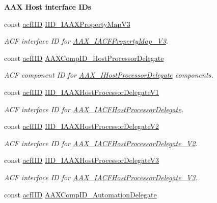 \begin{Indent}{\bf A\+A\+X Host interface I\+Ds}
\begin{DoxyCompactItemize}
const \hyperlink{a00150_a59df0b41744eee7a066787aaedf97f67}{acf\+I\+I\+D} \hyperlink{a00299_a26d424454425e6feb3a0c120466fe971}{I\+I\+D\+\_\+\+I\+A\+A\+X\+Property\+Map\+V3}
\begin{DoxyCompactList}\small\item\em A\+C\+F interface I\+D for \hyperlink{a00081}{A\+A\+X\+\_\+\+I\+A\+C\+F\+Property\+Map\+\_\+\+V3}. \end{DoxyCompactList}\item 
const \hyperlink{a00150_a59df0b41744eee7a066787aaedf97f67}{acf\+I\+I\+D} \hyperlink{a00299_a40a355114433e32688af311798bbede0}{A\+A\+X\+Comp\+I\+D\+\_\+\+Host\+Processor\+Delegate}
\begin{DoxyCompactList}\small\item\em A\+C\+F component I\+D for \hyperlink{a00102}{A\+A\+X\+\_\+\+I\+Host\+Processor\+Delegate} components. \end{DoxyCompactList}\item 
const \hyperlink{a00150_a59df0b41744eee7a066787aaedf97f67}{acf\+I\+I\+D} \hyperlink{a00299_a835d34cca68638475f257a61cd4e8da3}{I\+I\+D\+\_\+\+I\+A\+A\+X\+Host\+Processor\+Delegate\+V1}
\begin{DoxyCompactList}\small\item\em A\+C\+F interface I\+D for \hyperlink{a00068}{A\+A\+X\+\_\+\+I\+A\+C\+F\+Host\+Processor\+Delegate}. \end{DoxyCompactList}\item 
const \hyperlink{a00150_a59df0b41744eee7a066787aaedf97f67}{acf\+I\+I\+D} \hyperlink{a00299_abd901e3dd8fe09daf43b8891084448f3}{I\+I\+D\+\_\+\+I\+A\+A\+X\+Host\+Processor\+Delegate\+V2}
\begin{DoxyCompactList}\small\item\em A\+C\+F interface I\+D for \hyperlink{a00069}{A\+A\+X\+\_\+\+I\+A\+C\+F\+Host\+Processor\+Delegate\+\_\+\+V2}. \end{DoxyCompactList}\item 
const \hyperlink{a00150_a59df0b41744eee7a066787aaedf97f67}{acf\+I\+I\+D} \hyperlink{a00299_a41c70d23eb7fdcc1fa69e5ffab1eb38a}{I\+I\+D\+\_\+\+I\+A\+A\+X\+Host\+Processor\+Delegate\+V3}
\begin{DoxyCompactList}\small\item\em A\+C\+F interface I\+D for \hyperlink{a00070}{A\+A\+X\+\_\+\+I\+A\+C\+F\+Host\+Processor\+Delegate\+\_\+\+V3}. \end{DoxyCompactList}\item 
const \hyperlink{a00150_a59df0b41744eee7a066787aaedf97f67}{acf\+I\+I\+D} \hyperlink{a00299_aa22fc51d81b9a4f8fab4f819ca3f85d9}{A\+A\+X\+Comp\+I\+D\+\_\+\+Automation\+Delegate}

\end{DoxyCompactItemize}
\end{Indent}
